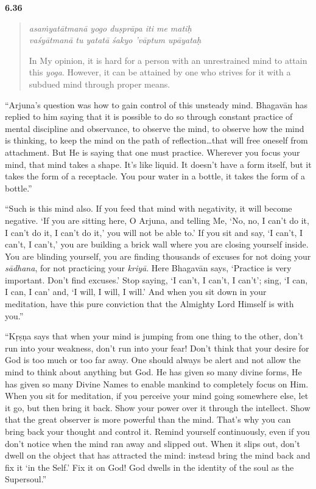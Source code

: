 \par\noindent\textbf{6.36}\par
\begin{verse}
\textit{asaṁyatātmanā yogo duṣprāpa iti me matiḥ} \\
\textit{vaśyātmanā tu yatatā śakyo ’vāptum upāyataḥ}

\noindent In My opinion, it is hard for a person with an unrestrained mind to attain this \textit{yoga}. However, it can be attained by one who strives for it with a subdued mind through proper means.
\end{verse}
\par


\enquote{Arjuna’s question was how to gain control of this unsteady mind. Bhagavān has replied to him saying that it is possible to do so through constant practice of mental discipline and observance, to observe the mind, to observe how the mind is thinking, to keep the mind on the path of reflection\ldots that will free oneself from attachment. But He is saying that one must practice. Wherever you focus your mind, that mind takes a shape. It’s like liquid. It doesn’t have a form itself, but it takes the form of a receptacle. You pour water in a bottle, it takes the form of a bottle.}

\enquote{Such is this mind also. If you feed that mind with negativity, it will become negative. \enquote{If you are sitting here, O Arjuna, and telling Me, ‘No, no, I can’t do it, I can’t do it, I can’t do it,’ you will not be able to.} If you sit and say, \enquote{I can’t, I can’t, I can’t,} you are building a brick wall where you are closing yourself inside. You are blinding yourself, you are finding thousands of excuses for not doing your \textit{sādhana}, for not practicing your \textit{kriyā}. Here Bhagavān says, \enquote{Practice is very important. Don’t find excuses.} Stop saying, \enquote{I can’t, I can’t, I can’t}; sing, \enquote{I can, I can, I can} and, \enquote{I will, I will, I will.} And when you sit down in your meditation, have this pure conviction that the Almighty Lord Himself is with you.}

\enquote{Kṛṣṇa says that when your mind is jumping from one thing to the other, don’t run into your weakness, don’t run into your fear! Don’t think that your desire for God is too much or too far away. One should always be alert and not allow the mind to think about anything but God. He has given so many divine forms, He has given so many Divine Names to enable mankind to completely focus on Him. When you sit for meditation, if you perceive your mind going somewhere else, let it go, but then bring it back. Show your power over it through the intellect. Show that the great observer is more powerful than the mind. That’s why you can bring back your thought and control it. Remind yourself continuously, even if you don’t notice when the mind ran away and slipped out. When it slips out, don’t dwell on the object that has attracted the mind: instead bring the mind back and fix it \enquote{in the Self.} Fix it on God! God dwells in the identity of the soul as the Supersoul.}

